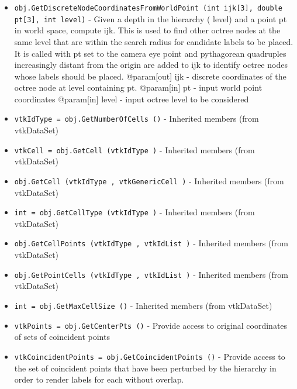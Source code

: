 \begin{itemize}
\item  \verb|obj.GetDiscreteNodeCoordinatesFromWorldPoint (int ijk[3], double pt[3], int level)| -  Given a depth in the hierarchy ( level) and a point  pt in world space, compute  ijk.
 This is used to find other octree nodes at the same  level that are within the search radius
 for candidate labels to be placed. It is called with  pt set to the camera eye point and
 pythagorean quadruples increasingly distant from the origin are added to  ijk to identify
 octree nodes whose labels should be placed.
 @param[out] ijk - discrete coordinates of the octree node at  level containing  pt.
 @param[in]  pt - input world point coordinates
 @param[in]  level - input octree level to be considered

\item  \verb|vtkIdType = obj.GetNumberOfCells ()| -  Inherited members (from vtkDataSet)

\item  \verb|vtkCell = obj.GetCell (vtkIdType )| -  Inherited members (from vtkDataSet)

\item  \verb|obj.GetCell (vtkIdType , vtkGenericCell )| -  Inherited members (from vtkDataSet)

\item  \verb|int = obj.GetCellType (vtkIdType )| -  Inherited members (from vtkDataSet)

\item  \verb|obj.GetCellPoints (vtkIdType , vtkIdList )| -  Inherited members (from vtkDataSet)

\item  \verb|obj.GetPointCells (vtkIdType , vtkIdList )| -  Inherited members (from vtkDataSet)

\item  \verb|int = obj.GetMaxCellSize ()| -  Inherited members (from vtkDataSet)

\item  \verb|vtkPoints = obj.GetCenterPts ()| -  Provide access to original coordinates of sets of coincident points

\item  \verb|vtkCoincidentPoints = obj.GetCoincidentPoints ()| -  Provide access to the set of coincident points that have been
 perturbed by the hierarchy in order to render labels for each
 without overlap.

\end{itemize}

